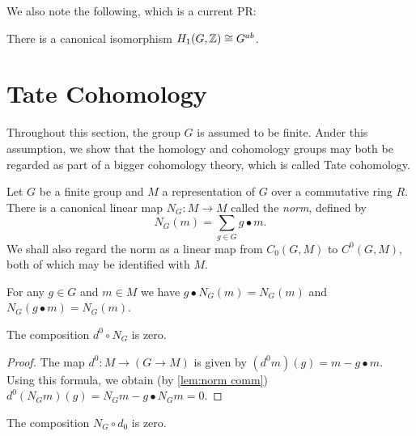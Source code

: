 We also note the following, which is a current PR:

\begin{lemma}	\label{lem:homology 1 Z}
	\leanok
	There is a canonical isomorphism $H_{1}(G,{\mathbb Z}) \cong G^{ab}$.
\end{lemma}



\section{Tate Cohomology}

Throughout this section, the group $G$ is assumed to be finite.
Ander this assumption, we show that the homology and cohomology groups
may both be regarded as part of a bigger cohomology theory, which is called Tate cohomology.

\begin{definition} \label{def:norm}
	Let $G$ be a finite group and $M$ a representation of $G$ over a commutative ring $R$.
	There is a canonical linear map $N_G : M \to M$ called the \emph{norm},
	defined by
	\[
		N_G(m) = \sum_{g \in G} g \bullet m.
	\]
	We shall also regard the norm as a linear map from $C_0(G,M)$ to $C^0(G,M)$, both of which may
	be identified with $M$.
\end{definition}

\begin{lemma}	\label{lem:norm comm}
	\leanok
	For any $g \in G$ and $m \in M$ we have $g \bullet N_G (m) = N_G (m)$
	and $N_G (g \bullet m) = N_G (m)$.
\end{lemma}

\begin{lemma}	\label{lem:norm comp d}
	\leanok
	The composition $d^0 \circ N_G$ is zero.
\end{lemma}

\begin{proof}
	The map $d^0 : M \to (G \to M)$ is given by
	$(d^0 m)(g) = m - g\bullet m$.
	Using this formula, we obtain (by \ref{lem:norm comm})
	$d^0 (N_G m) (g) = N_G m - g \bullet N_G m = 0$.
\end{proof}

\begin{lemma}	\label{lem:d comp norm}
	The composition $N_G \circ d_0$ is zero.
\end{lemma}

